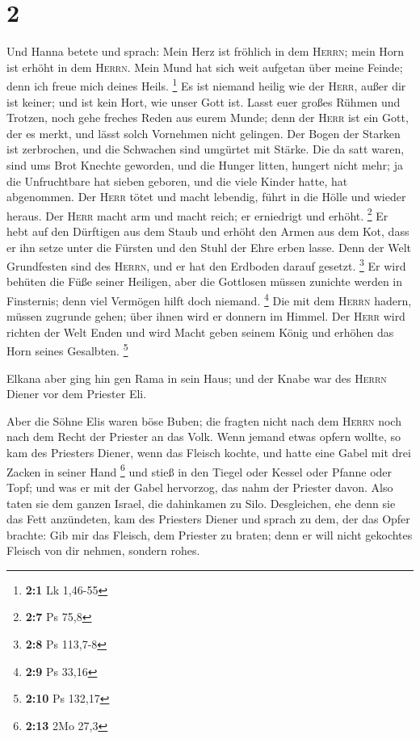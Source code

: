 \hypertarget{section-1}{%
\section{2}\label{section-1}}

 Und Hanna betete und sprach: Mein Herz ist fröhlich in
dem \textsc{Herrn}; mein Horn ist erhöht in dem \textsc{Herrn}. Mein
Mund hat sich weit aufgetan über meine Feinde; denn ich freue mich
deines Heils. \footnote{\textbf{2:1} Lk 1,46-55}  Es ist
niemand heilig wie der \textsc{Herr}, außer dir ist keiner; und ist kein
Hort, wie unser Gott ist.  Lasst euer großes Rühmen und
Trotzen, noch gehe freches Reden aus eurem Munde; denn der \textsc{Herr}
ist ein Gott, der es merkt, und lässt solch Vornehmen nicht gelingen.
 Der Bogen der Starken ist zerbrochen, und die Schwachen
sind umgürtet mit Stärke.  Die da satt waren, sind ums
Brot Knechte geworden, und die Hunger litten, hungert nicht mehr; ja die
Unfruchtbare hat sieben geboren, und die viele Kinder hatte, hat
abgenommen.  Der \textsc{Herr} tötet und macht lebendig,
führt in die Hölle und wieder heraus.  Der \textsc{Herr}
macht arm und macht reich; er erniedrigt und erhöht. \footnote{\textbf{2:7}
  Ps 75,8}  Er hebt auf den Dürftigen aus dem Staub und
erhöht den Armen aus dem Kot, dass er ihn setze unter die Fürsten und
den Stuhl der Ehre erben lasse. Denn der Welt Grundfesten sind des
\textsc{Herrn}, und er hat den Erdboden darauf gesetzt. \footnote{\textbf{2:8}
  Ps 113,7-8}  Er wird behüten die Füße seiner Heiligen,
aber die Gottlosen müssen zunichte werden in Finsternis; denn viel
Vermögen hilft doch niemand. \footnote{\textbf{2:9} Ps 33,16}
 Die mit dem \textsc{Herrn} hadern, müssen zugrunde
gehen; über ihnen wird er donnern im Himmel. Der \textsc{Herr} wird
richten der Welt Enden und wird Macht geben seinem König und erhöhen das
Horn seines Gesalbten. \footnote{\textbf{2:10} Ps 132,17}

 Elkana aber ging hin gen Rama in sein Haus; und der
Knabe war des \textsc{Herrn} Diener vor dem Priester Eli.

 Aber die Söhne Elis waren böse Buben; die fragten nicht
nach dem \textsc{Herrn}  noch nach dem Recht der Priester
an das Volk. Wenn jemand etwas opfern wollte, so kam des Priesters
Diener, wenn das Fleisch kochte, und hatte eine Gabel mit drei Zacken in
seiner Hand \footnote{\textbf{2:13} 2Mo 27,3}  und stieß
in den Tiegel oder Kessel oder Pfanne oder Topf; und was er mit der
Gabel hervorzog, das nahm der Priester davon. Also taten sie dem ganzen
Israel, die dahinkamen zu Silo.  Desgleichen, ehe denn
sie das Fett anzündeten, kam des Priesters Diener und sprach zu dem, der
das Opfer brachte: Gib mir das Fleisch, dem Priester zu braten; denn er
will nicht gekochtes Fleisch von dir nehmen, sondern rohes.


